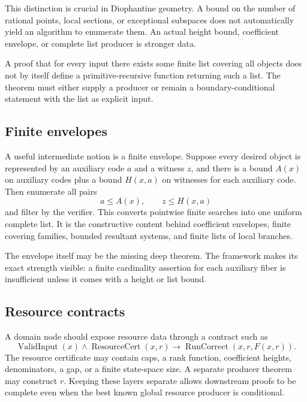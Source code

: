 This distinction is crucial in Diophantine geometry.  A bound on the number of rational points, local
sections, or exceptional subspaces does not automatically yield an algorithm to enumerate them.  An actual
height bound, coefficient envelope, or complete list producer is stronger data.

\begin{warning}
A proof that for every input there exists some finite list covering all objects does not by itself define a
primitive-recursive function returning such a list.  The theorem must either supply a producer or remain a
boundary-conditional statement with the list as explicit input.
\end{warning}

\subsection{Finite envelopes}

A useful intermediate notion is a finite envelope.  Suppose every desired object is represented by an
auxiliary code \(a\) and a witness \(z\), and there is a bound \(A(x)\) on auxiliary codes plus a bound
\(H(x,a)\) on witnesses for each auxiliary code.  Then enumerate all pairs
\[
 a\le A(x),\qquad z\le H(x,a)
\]
and filter by the verifier.  This converts pointwise finite searches into one uniform complete list.  It is
the constructive content behind coefficient envelopes, finite covering families, bounded resultant
systems, and finite lists of local branches.

The envelope itself may be the missing deep theorem.  The framework makes its exact strength visible: a
finite cardinality assertion for each auxiliary fiber is insufficient unless it comes with a height or
list bound.

\subsection{Resource contracts}

A domain node should expose resource data through a contract such as
\[
  \operatorname{ValidInput}(x)\wedge\operatorname{ResourceCert}(x,r)
  \to
  \operatorname{RunCorrect}(x,r,F(x,r)).
\]
The resource certificate may contain caps, a rank function, coefficient heights, denominators, a gap, or a
finite state-space size.  A separate producer theorem may construct \(r\).  Keeping these layers separate
allows downstream proofs to be complete even when the best known global resource producer is conditional.

